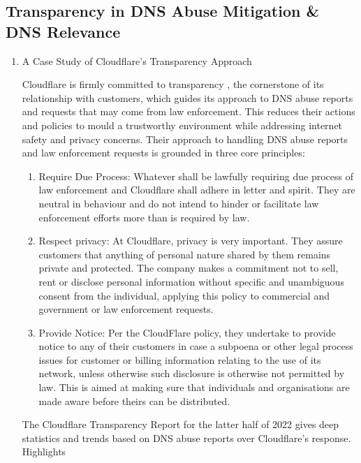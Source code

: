 \subsection{Transparency in DNS Abuse Mitigation \& DNS Relevance}

\begin{enumerate}
    \item A Case Study of Cloudflare's Transparency Approach


Cloudflare is firmly committed to transparency \cite{cloudflare_transparency_2022}, the cornerstone of its relationship with customers, which guides its approach to DNS abuse reports and requests that may come from law enforcement. This reduces their actions and policies to mould a trustworthy environment while addressing internet safety and privacy concerns. Their approach to handling DNS abuse reports and law enforcement requests is grounded in three core principles:

\begin{enumerate}
    \item Require Due Process:  Whatever shall be lawfully requiring due process of law enforcement and Cloudflare shall adhere in letter and spirit. They are neutral in behaviour and do not intend to hinder or facilitate law enforcement efforts more than is required by law.
    \item Respect privacy: At Cloudflare, privacy is very important. They assure customers that anything of personal nature shared by them remains private and protected. The company makes a commitment not to sell, rent or disclose personal information without specific and unambiguous consent from the individual, applying this policy to commercial and government or law enforcement requests.
    \item Provide Notice: Per the CloudFlare policy, they undertake to provide notice to any of their customers in case a subpoena or other legal process issues for customer or billing information relating to the use of its network, unless otherwise such disclosure is otherwise not permitted by law. This is aimed at making sure that individuals and organisations are made aware before theirs can be distributed.
\end{enumerate}

The Cloudflare Transparency Report for the latter half of 2022 gives deep statistics and trends based on DNS abuse reports over Cloudflare's response. Highlights


\end{enumerate}

